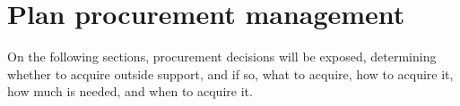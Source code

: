 \chapter{Plan procurement management}
On the following sections, procurement decisions  will be exposed, determining whether to acquire outside support, and if so, what to acquire, how to acquire it, how much is needed, and when to acquire it.

